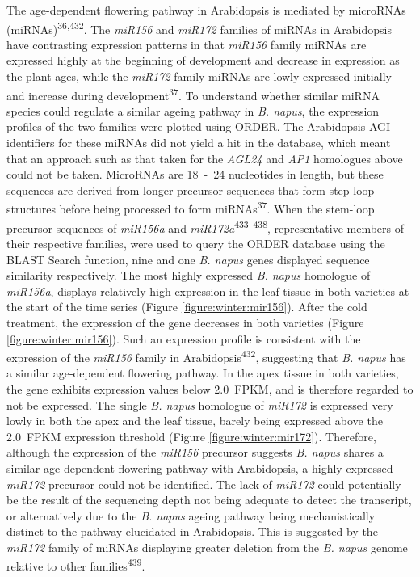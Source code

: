 \documentclass[12pt,]{book}
\begin{document}
The age-dependent flowering pathway in Arabidopsis is mediated by
microRNAs (miRNAs)\textsuperscript{36,432}. The \emph{miR156} and
\emph{miR172} families of miRNAs in Arabidopsis have contrasting
expression patterns in that \emph{miR156} family miRNAs are expressed
highly at the beginning of development and decrease in expression as the
plant ages, while the \emph{miR172} family miRNAs are lowly expressed
initially and increase during development\textsuperscript{37}. To
understand whether similar miRNA species could regulate a similar ageing
pathway in \emph{B. napus}, the expression profiles of the two families
were plotted using ORDER. The Arabidopsis AGI identifiers for these
miRNAs did not yield a hit in the database, which meant that an approach
such as that taken for the \emph{AGL24} and \emph{AP1} homologues above
could not be taken. MicroRNAs are 18~-~24 nucleotides in length, but
these sequences are derived from longer precursor sequences that form
step-loop structures before being processed to form
miRNAs\textsuperscript{37}. When the stem-loop precursor sequences of
\emph{miR156a} and \emph{miR172a}\textsuperscript{433--438},
representative members of their respective families, were used to query
the ORDER database using the BLAST Search function, nine and one
\emph{B. napus} genes displayed sequence similarity respectively. The
most highly expressed \emph{B. napus} homologue of \emph{miR156a},
displays relatively high expression in the leaf tissue in both varieties
at the start of the time series (Figure \ref{figure:winter:mir156}).
After the cold treatment, the expression of the gene decreases in both
varieties (Figure \ref{figure:winter:mir156}). Such an expression
profile is consistent with the expression of the \emph{miR156} family in
Arabidopsis\textsuperscript{432}, suggesting that \emph{B. napus} has a
similar age-dependent flowering pathway. In the apex tissue in both
varieties, the gene exhibits expression values below 2.0~FPKM, and is
therefore regarded to not be expressed. The single \emph{B. napus}
homologue of \emph{miR172} is expressed very lowly in both the apex and
the leaf tissue, barely being expressed above the 2.0~FPKM expression
threshold (Figure \ref{figure:winter:mir172}). Therefore, although the
expression of the \emph{miR156} precursor suggests \emph{B. napus}
shares a similar age-dependent flowering pathway with Arabidopsis, a
highly expressed \emph{miR172} precursor could not be identified. The
lack of \emph{miR172} could potentially be the result of the sequencing
depth not being adequate to detect the transcript, or alternatively due
to the \emph{B. napus} ageing pathway being mechanistically distinct to
the pathway elucidated in Arabidopsis. This is suggested by the
\emph{miR172} family of miRNAs displaying greater deletion from the
\emph{B. napus} genome relative to other families\textsuperscript{439}.
\end{document}
